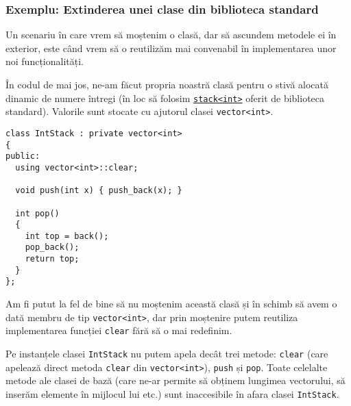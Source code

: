 \subsubsection*{Exemplu: Extinderea unei clase din biblioteca standard}

Un scenariu în care vrem să moștenim o clasă, dar să ascundem metodele ei în exterior, este când vrem să o reutilizăm mai convenabil în implementarea unor noi funcționalități.

În codul de mai jos, ne-am făcut propria noastră clasă pentru o stivă alocată dinamic de numere întregi (în loc să folosim \href{https://www.geeksforgeeks.org/stack-in-cpp-stl/}{\texttt{stack<int>}} oferit de biblioteca standard). Valorile sunt stocate cu ajutorul clasei \texttt{vector<int>}.
\begin{lstlisting}
class IntStack : private vector<int>
{
public:
  using vector<int>::clear;

  void push(int x) { push_back(x); }

  int pop()
  {
    int top = back();
    pop_back();
    return top;
  }
};
\end{lstlisting}

Am fi putut la fel de bine să nu moștenim această clasă și în schimb să avem o dată membru de tip \texttt{vector<int>}, dar prin moștenire putem reutiliza implementarea funcției \texttt{clear} fără să o mai redefinim.

Pe instanțele clasei \texttt{IntStack} nu putem apela decât trei metode: \texttt{clear} (care apelează direct metoda \texttt{clear} din \texttt{vector<int>}), \texttt{push} și \texttt{pop}. Toate celelalte metode ale clasei de bază (care ne-ar permite să obținem lungimea vectorului, să inserăm elemente în mijlocul lui etc.) sunt inaccesibile în afara clasei \texttt{IntStack}.